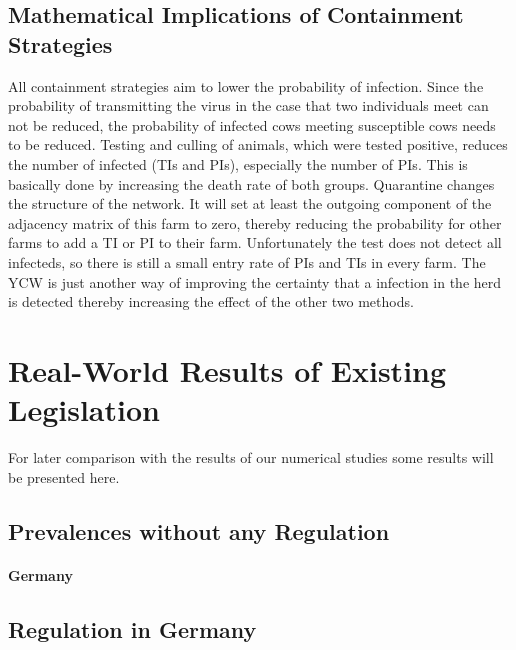 \subsection{Mathematical Implications of Containment Strategies}
All containment strategies aim to lower the probability of infection. Since the probability of transmitting the virus in the case that two individuals meet can not be reduced, the probability of infected cows meeting susceptible cows needs to be reduced. 
Testing and culling of animals, which were tested positive, reduces the number of infected (TIs and PIs), especially the number of PIs. This is basically done by increasing the death rate of both groups. 
Quarantine changes the structure of the network. It will set at least the outgoing component of the adjacency matrix of this farm to zero, thereby reducing the probability for other farms to add a TI or PI to their farm. Unfortunately the test does not detect all infecteds, so there is still a small entry rate of PIs and TIs in every farm.
The YCW is just another way of improving the certainty that a infection in the herd is detected thereby increasing the effect of the other two methods.

\section{Real-World Results of Existing Legislation}\label{chap:rlData}
For later comparison with the results of our numerical studies some results will be presented here. 

\subsection{Prevalences without any Regulation}

\paragraph{Germany}
\subsection{Regulation in Germany}\label{chap:rlDataRegulationGermany}
